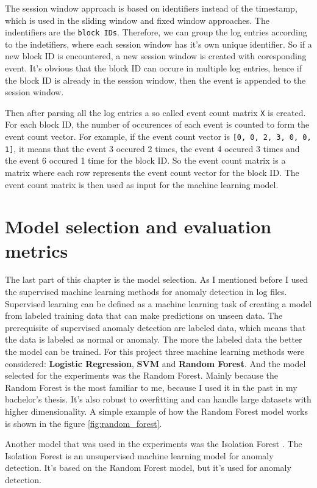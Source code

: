 The session window approach is based on identifiers instead of the timestamp, which is used in the sliding window and fixed window approaches. 
The indentifiers are the \texttt{block IDs}. Therefore, we can group the log entries according to the indetifiers, where each session window has it's own unique identifier.
So if a new block ID is encountered, a new session window is created with coresponding event. It's obvious that the block ID can occure in multiple log entries, hence if the block ID is already in the session window, then the event is appended to the session window.

Then after parsing all the log entries a so called event count matrix \texttt{X} is created. For each block ID, the number of occurences of each event is counted to form the event count vector.
For example, if the event count vector is \texttt{[0, 0, 2, 3, 0, 0, 1]}, it means that the event 3 occured 2 times, the event 4 occured 3 times and the event 6 occured 1 time for the block ID.
So the event count matrix is a matrix where each row represents the event count vector for the block ID. The event count matrix is then used as input for the machine learning model.

\section{Model selection and evaluation metrics} \label{model}

The last part of this chapter is the model selection. As I mentioned before I used the supervised machine learning methods for anomaly detection in log files. Supervised learning can be defined 
as a machine learning task of creating a model from labeled training data that can make predictions on unseen data.
The prerequisite of supervised anomaly detection are labeled data, which means that the data is labeled as normal or anomaly. The more the labeled data the better the model can be trained.
For this project three machine learning methods were considered: \textbf{Logistic Regression}, \textbf{SVM} and \textbf{Random Forest}. And the model selected for the experiments was the Random Forest.
Mainly because the Random Forest is the most familiar to me, because I used it in the past in my bachelor's thesis. It's also robust to overfitting and can handle large datasets with higher dimensionality.
A simple example of how the Random Forest model works is shown in the figure \ref{fig:random_forest}.

Another model that was used in the experiments was the Isolation Forest \cite{rf}. %
The Isolation Forest is an unsupervised machine learning model for anomaly detection. It's based on the Random Forest model, but it's used for anomaly detection.

